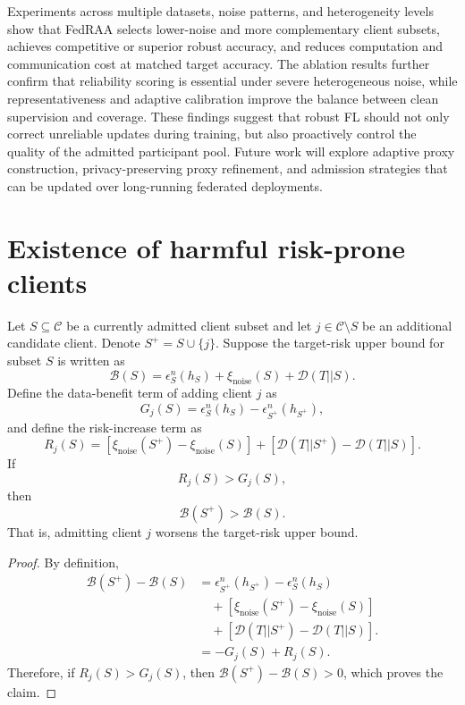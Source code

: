 \documentclass[conference]{IEEEtran}
\theoremstyle{definition}
\theoremstyle{remark}
\begin{document}
Experiments across multiple datasets, noise patterns, and heterogeneity levels show that FedRAA selects lower-noise and more complementary client subsets, achieves competitive or superior robust accuracy, and reduces computation and communication cost at matched target accuracy.
The ablation results further confirm that reliability scoring is essential under severe heterogeneous noise, while representativeness and adaptive calibration improve the balance between clean supervision and coverage.
These findings suggest that robust FL should not only correct unreliable updates during training, but also proactively control the quality of the admitted participant pool.
Future work will explore adaptive proxy construction, privacy-preserving proxy refinement, and admission strategies that can be updated over long-running federated deployments.




\appendices

\section{Existence of harmful risk-prone clients}
\label{app:harmful_risk_prone_client}
Let $S\subseteq\mathcal{C}$ be a currently admitted client subset and let 
$j\in\mathcal{C}\setminus S$ be an additional candidate client. 
Denote $S^+=S\cup\{j\}$. 
Suppose the target-risk upper bound for subset $S$ is written as
\[
\mathcal{B}(S)
=
\epsilon_S^n(h_S)
+
\xi_{\mathrm{noise}}(S)
+
\mathcal{D}(T||S).
\]
Define the data-benefit term of adding client $j$ as
\[
G_j(S)
=
\epsilon_S^n(h_S)
-
\epsilon_{S^+}^n(h_{S^+}),
\]
and define the risk-increase term as
\[
R_j(S)
=
\left[
\xi_{\mathrm{noise}}(S^+)-\xi_{\mathrm{noise}}(S)
\right]
+
\left[\mathcal{D}(T||S^+)
-
\mathcal{D}(T||S)\right].
\]
If
\[
R_j(S)>G_j(S),
\]
then
\[
\mathcal{B}(S^+)>\mathcal{B}(S).
\]
That is, admitting client $j$ worsens the target-risk upper bound.


\begin{proof}
By definition,
\[
\begin{aligned}
\mathcal{B}(S^+)-\mathcal{B}(S)
&=
\epsilon_{S^+}^n(h_{S^+})
-
\epsilon_S^n(h_S)
\\
&\quad+
\left[
\xi_{\mathrm{noise}}(S^+)-\xi_{\mathrm{noise}}(S)
\right]
\\
&\quad+
\left[\mathcal{D}(T||S^+)
-
\mathcal{D}(T||S)\right].
\\
&=
-G_j(S)+R_j(S).
\end{aligned}
\]
Therefore, if $R_j(S)>G_j(S)$, then 
$\mathcal{B}(S^+)-\mathcal{B}(S)>0$, which proves the claim.
\end{proof}
\end{document}
